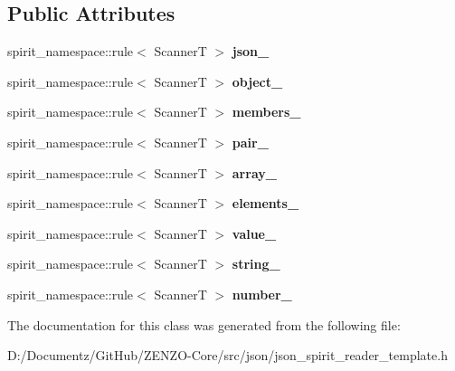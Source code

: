 \subsection*{Public Attributes}
\begin{DoxyCompactItemize}
\item 
\mbox{\label{classjson__spirit_1_1_json__grammer_1_1definition_a2a4514fb3de3c730ab06a9efabed0cd2}} 
spirit\+\_\+namespace\+::rule$<$ ScannerT $>$ {\bfseries json\+\_\+}
\item 
\mbox{\label{classjson__spirit_1_1_json__grammer_1_1definition_a4610053a045e001c3c2a949974449a0b}} 
spirit\+\_\+namespace\+::rule$<$ ScannerT $>$ {\bfseries object\+\_\+}
\item 
\mbox{\label{classjson__spirit_1_1_json__grammer_1_1definition_a47e593c30af21ca336a5e0b8643fbf0c}} 
spirit\+\_\+namespace\+::rule$<$ ScannerT $>$ {\bfseries members\+\_\+}
\item 
\mbox{\label{classjson__spirit_1_1_json__grammer_1_1definition_ad69f68497d5955a0c432760e07e32523}} 
spirit\+\_\+namespace\+::rule$<$ ScannerT $>$ {\bfseries pair\+\_\+}
\item 
\mbox{\label{classjson__spirit_1_1_json__grammer_1_1definition_a0bf73f379e424f5e3b60318c6161aa7f}} 
spirit\+\_\+namespace\+::rule$<$ ScannerT $>$ {\bfseries array\+\_\+}
\item 
\mbox{\label{classjson__spirit_1_1_json__grammer_1_1definition_a43473ad5f8e968259fbef7b28e793b58}} 
spirit\+\_\+namespace\+::rule$<$ ScannerT $>$ {\bfseries elements\+\_\+}
\item 
\mbox{\label{classjson__spirit_1_1_json__grammer_1_1definition_aef39f18976abab0f07c8cc52379ab7aa}} 
spirit\+\_\+namespace\+::rule$<$ ScannerT $>$ {\bfseries value\+\_\+}
\item 
\mbox{\label{classjson__spirit_1_1_json__grammer_1_1definition_a0f8f712ca15aba3f388c5ca4e7a5fd07}} 
spirit\+\_\+namespace\+::rule$<$ ScannerT $>$ {\bfseries string\+\_\+}
\item 
\mbox{\label{classjson__spirit_1_1_json__grammer_1_1definition_a664513d2923170ddf2a27fadc5116eb5}} 
spirit\+\_\+namespace\+::rule$<$ ScannerT $>$ {\bfseries number\+\_\+}
\end{DoxyCompactItemize}


The documentation for this class was generated from the following file\+:\begin{DoxyCompactItemize}
\item 
D\+:/\+Documentz/\+Git\+Hub/\+Z\+E\+N\+Z\+O-\/\+Core/src/json/json\+\_\+spirit\+\_\+reader\+\_\+template.\+h\end{DoxyCompactItemize}

